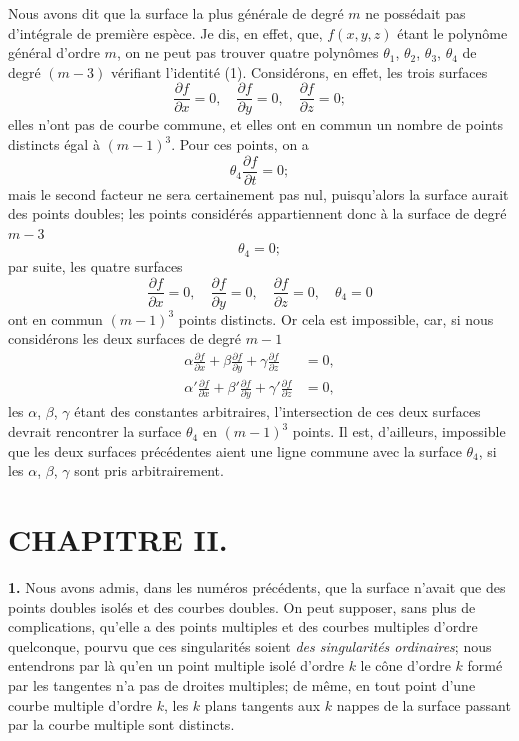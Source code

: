 \documentclass{article}
\begin{document}
Nous avons dit que la surface la plus générale de degré $m$ ne possédait pas d'intégrale de première espèce. Je dis, en effet, que, $f(x, y, z)$ étant le polynôme général d'ordre $m$, on ne peut pas trouver quatre polynômes $\theta_{1}$, $\theta_{2}$, $\theta_{3}$, $\theta_{4}$ de degré $(m - 3)$ vérifiant l'identité (1). Considérons, en effet, les trois surfaces
\[
\frac{\partial f}{\partial x} = 0, \quad \frac{\partial f}{\partial y} = 0, \quad \frac{\partial f}{\partial z} = 0;
\]
elles n'ont pas de courbe commune, et elles ont en commun un nombre de points distincts égal à $(m - 1)^{3}$. Pour ces points, on a
\[
\theta_{4} \frac{\partial f}{\partial t} = 0;
\]
mais le second facteur ne sera certainement pas nul, puisqu'alors la surface aurait des points doubles; les points considérés appartiennent donc à la surface de degré $m - 3$
\[
\theta_{4} = 0;
\]
par suite, les quatre surfaces
\[
\frac{\partial f}{\partial x} = 0, \quad \frac{\partial f}{\partial y} = 0, \quad \frac{\partial f}{\partial z} = 0, \quad \theta_{4} = 0
\]
ont en commun $(m - 1)^{3}$ points distincts. Or cela est impossible, car, si nous considérons les deux surfaces de degré $m - 1$
\[
\begin{aligned}
\alpha \frac{\partial f}{\partial x} + \beta \frac{\partial f}{\partial y} + \gamma \frac{\partial f}{\partial z} &= 0, \\
\alpha' \frac{\partial f}{\partial x} + \beta' \frac{\partial f}{\partial y} + \gamma' \frac{\partial f}{\partial z} &= 0,
\end{aligned}
\]
les $\alpha$, $\beta$, $\gamma$ étant des constantes arbitraires, l'intersection de ces deux surfaces devrait rencontrer la surface $\theta_{4}$ en $(m - 1)^{3}$ points. Il est, d'ailleurs, impossible que les deux surfaces précédentes aient une ligne commune avec la surface $\theta_{4}$, si les $\alpha$, $\beta$, $\gamma$ sont pris arbitrairement.

\section*{CHAPITRE II.}

\textbf{1.} Nous avons admis, dans les numéros précédents, que la surface n'avait que des points doubles isolés et des courbes doubles. On peut supposer, sans plus de complications, qu'elle a des points multiples et des courbes multiples d'ordre quelconque, pourvu que ces singularités soient \emph{des singularités ordinaires}; nous entendrons par là qu'en un point multiple isolé d'ordre $k$ le cône d'ordre $k$ formé par les tangentes n'a pas de droites multiples; de même, en tout point d'une courbe multiple d'ordre $k$, les $k$ plans tangents aux $k$ nappes de la surface passant par la courbe multiple sont distincts.
\end{document}
